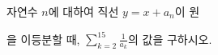 자연수 $n$에 대하여 직선 $y=x+a_n$이 원 \par\smallskip{}\par\smallskip\noindent 을 이등분할 때, $\displaystyle\sum_{k=2}^{15}\frac{1}{a_k}$의 값을 구하시오.

